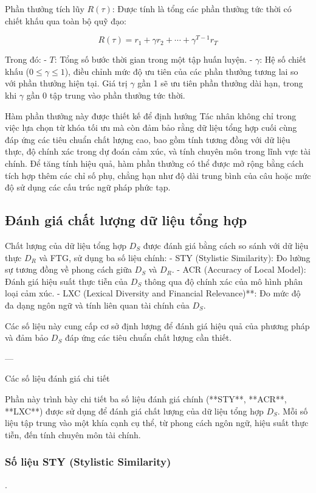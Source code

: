 \documentclass[a4paper,10pt]{article}
\begin{document}
Phần thưởng tích lũy \(R(\tau)\): Được tính là tổng các phần thưởng tức thời có chiết khấu qua toàn bộ quỹ đạo:

\[
R(\tau) = r_1 + \gamma r_2 + \cdots + \gamma^{T-1} r_T
\]

Trong đó:
- \(T\): Tổng số bước thời gian trong một tập huấn luyện.
- \(\gamma\): Hệ số chiết khấu (\(0 \leq \gamma \leq 1\)), điều chỉnh mức độ ưu tiên của các phần thưởng tương lai so với phần thưởng hiện tại. Giá trị \(\gamma\) gần 1 sẽ ưu tiên phần thưởng dài hạn, trong khi \(\gamma\) gần 0 tập trung vào phần thưởng tức thời.

Hàm phần thưởng này được thiết kế để định hướng Tác nhân không chỉ trong việc lựa chọn từ khóa tối ưu mà còn đảm bảo rằng dữ liệu tổng hợp cuối cùng đáp ứng các tiêu chuẩn chất lượng cao, bao gồm tính tương đồng với dữ liệu thực, độ chính xác trong dự đoán cảm xúc, và tính chuyên môn trong lĩnh vực tài chính. Để tăng tính hiệu quả, hàm phần thưởng có thể được mở rộng bằng cách tích hợp thêm các chỉ số phụ, chẳng hạn như độ dài trung bình của câu hoặc mức độ sử dụng các cấu trúc ngữ pháp phức tạp.
\subsection{Đánh giá chất lượng dữ liệu tổng hợp}
Chất lượng của dữ liệu tổng hợp \( D_S \) được đánh giá bằng cách so sánh với dữ liệu thực \( D_R \) và FTG, sử dụng ba số liệu chính:
- STY (Stylistic Similarity): Đo lường sự tương đồng về phong cách giữa \( D_S \) và \( D_R \).
- ACR (Accuracy of Local Model): Đánh giá hiệu suất thực tiễn của \( D_S \) thông qua độ chính xác của mô hình phân loại cảm xúc.
- LXC (Lexical Diversity and Financial Relevance)**: Đo mức độ đa dạng ngôn ngữ và tính liên quan tài chính của \( D_S \).

Các số liệu này cung cấp cơ sở định lượng để đánh giá hiệu quả của phương pháp và đảm bảo \( D_S \) đáp ứng các tiêu chuẩn chất lượng cần thiết.

---

Các số liệu đánh giá chi tiết

Phần này trình bày chi tiết ba số liệu đánh giá chính (**STY**, **ACR**, **LXC**) được sử dụng để đánh giá chất lượng của dữ liệu tổng hợp \( D_S \). Mỗi số liệu tập trung vào một khía cạnh cụ thể, từ phong cách ngôn ngữ, hiệu suất thực tiễn, đến tính chuyên môn tài chính.

\subsubsection{Số liệu STY (Stylistic Similarity)}. 
\end{document}
